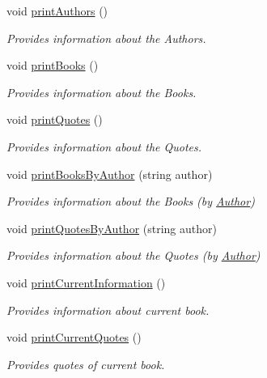 \begin{DoxyCompactItemize}
void \hyperlink{class_library_aba2ed0b3b1ee81565ca5b62f2ac5c924}{print\+Authors} ()
\begin{DoxyCompactList}\small\item\em Provides information about the Authors. \end{DoxyCompactList}\item 
void \hyperlink{class_library_a35220a3b5a4a6d9059cc4fc18ae4c0c3}{print\+Books} ()
\begin{DoxyCompactList}\small\item\em Provides information about the Books. \end{DoxyCompactList}\item 
void \hyperlink{class_library_a819acb04f4b8aea0547db50918b1c5fa}{print\+Quotes} ()
\begin{DoxyCompactList}\small\item\em Provides information about the Quotes. \end{DoxyCompactList}\item 
void \hyperlink{class_library_a6e22621933979ff5cb4e95de3f54b72c}{print\+Books\+By\+Author} (string author)
\begin{DoxyCompactList}\small\item\em Provides information about the Books (by \hyperlink{class_author}{Author}) \end{DoxyCompactList}\item 
void \hyperlink{class_library_aa13544bfe57c61164d9953518e88dcb0}{print\+Quotes\+By\+Author} (string author)
\begin{DoxyCompactList}\small\item\em Provides information about the Quotes (by \hyperlink{class_author}{Author}) \end{DoxyCompactList}\item 
void \hyperlink{class_library_a449a2d686922007674fa4a5efff89fe7}{print\+Current\+Information} ()
\begin{DoxyCompactList}\small\item\em Provides information about current book. \end{DoxyCompactList}\item 
void \hyperlink{class_library_a7be02d15c840e3d1c3ec998e204f7bf9}{print\+Current\+Quotes} ()
\begin{DoxyCompactList}\small\item\em Provides quotes of current book. \end{DoxyCompactList}\end{DoxyCompactItemize}
